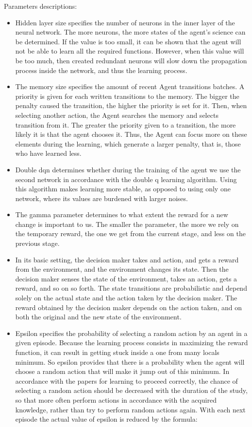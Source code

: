 \documentclass{article}
\begin{document}
Parameters descriptions:
\begin{itemize}
\item Hidden layer size specifies the number of neurons in the inner layer of the neural network.
The more neurons, the more states of the agent's science can be determined. 
If the value is too small, it can be shown that the agent will not be able to learn all the required functions.
However, when this value will be too much, then created redundant neurons will slow down the propagation process inside the network, and thus the learning process.

\item The memory size specifies the amount of recent Agent transitions batches.
A priority is given for each written transitions to the memory. 
The bigger the penalty caused the transition, the higher the priority is set for it.
Then, when selecting another action, the Agent searches the memory and selects transition from it. 
The greater the priority given to a transition, the more likely it is that the agent chooses it.
Thus, the Agent can focus more on these elements during the learning, 
which generate a larger penalty, that is, those who have learned less.

\item Double dqn determines whether during the training of the agent we use the second network in accordance with the double q learning algorithm.
Using this algorithm makes learning more stable, as opposed to using only one network, where its values are burdened with larger noises.

\item The gamma parameter determines to what extent the reward for a new change is important to us. 
The smaller the parameter, the more we rely on the temporary reward, the one we get from the current stage, and less on the previous stage.

\item In its basic setting, the decision maker takes and action, and gets a reward from the environment, and the environment changes its state. Then the decision maker senses the state of the environment, takes an action, gets a reward, and so on so forth. The state transitions are probabilistic and depend solely on the actual state and the action taken by the decision maker. The reward obtained by the decision maker depends on the action taken, and on both the original and the new state of the environment.

\item Epsilon specifies the probability of selecting a random action by an agent in a given episode.
Because the learning process consists in maximizing the reward function, it can result in getting stuck inside a one from many locals minimum.
So epsilon provides that there is a probability when the agent will choose a random action that will make it jump out of this minimum. In accordance with the papers for learning to proceed correctly,
the chance of selecting a random action should be decreased with the duration of the study,
so that more often perform actions in accordance with the acquired knowledge, rather than try to perform random actions again.
\newpage 
With each next episode the actual value of epsilon is reduced by the formula:


\end{itemize}
\end{document}
